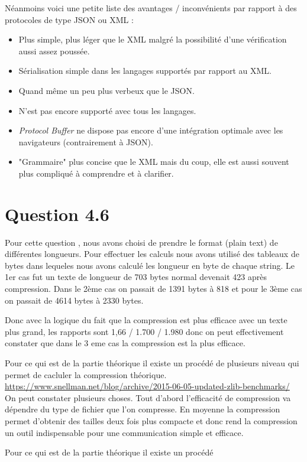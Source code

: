 \documentclass[12pt]{article}
\begin{document}
\begin{enumerate}[leftmargin=*, label=\alph*)]
Néanmoins voici une petite liste des avantages / inconvénients par rapport à des protocoles de type JSON ou XML : 

\begin{itemize}
\item Plus simple, plus léger que le XML malgré la possibilité d'une vérification aussi assez poussée.
\medskip
\item Sérialisation simple dans les langages supportés par rapport au XML.
\medskip
\item Quand même un peu plus verbeux que le JSON.
\medskip
\item N'est pas encore supporté avec tous les langages.
\medskip
\item \emph{Protocol Buffer} ne dispose pas encore d'une intégration optimale avec les navigateurs (contrairement à JSON).
\medskip
\item "Grammaire" plus concise que le XML mais du coup, elle est aussi souvent plus compliqué à comprendre et à clarifier.
\end{itemize}

\end{enumerate}

\section*{Question 4.6}
Pour cette question , nous avons choisi de prendre le format (plain text) de différentes longueurs.
Pour effectuer les calculs nous avons utilisé des tableaux de bytes dans lequeles nous avons calculé les longueur en byte de chaque string.
Le 1er cas fut un texte de longueur de 703 bytes normal devenait 423 après compression.
Dans le 2ème cas on passait de 1391 bytes à 818 et pour le 3ème cas on passait de 4614 bytes à 2330 bytes.

Donc avec la logique du fait que la compression est plus efficace avec un texte plus grand,
les rapports sont 1,66 / 1.700 / 1.980 donc on peut effectivement constater que dans le 3 eme cas la
compression est la plus efficace.

Pour ce qui est de la partie théorique il existe un procédé de plusieurs niveau qui permet de cacluler la compression théorique.
\newline
\url{https://www.snellman.net/blog/archive/2015-06-05-updated-zlib-benchmarks/}
On peut constater plusieurs choses. Tout d'abord l'efficacité de compression va dépendre du type de fichier que l'on compresse. 
\newline
En moyenne la compression permet d'obtenir des tailles deux fois plus compacte et donc rend la compression un outil indispensable pour une communication simple et efficace.

Pour ce qui est de la partie théorique il existe un procédé 
\end{document}

